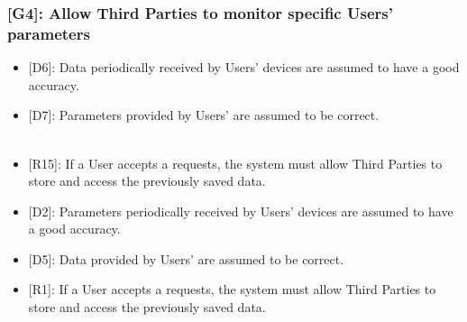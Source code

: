 \documentclass[12pt,a4paper]{article}
\begin{document}
	\subsubsection*{{[}{G4}{]}: Allow Third Parties to monitor specific Users' parameters}
	\begin{itemize}
		\begin{itemize}
			\item {[D6]}: Data periodically received by Users' devices are assumed to have a good accuracy. 
			\item {[D7]}: Parameters provided by Users' are assumed to be correct. 
			\\\\
			\item {[R15]}: If a User accepts a requests, the system must allow Third Parties to store and access the previously saved data.
			\item {[D2]}: Parameters periodically received by Users' devices are assumed to have a good accuracy. 
			\item {[D5]}: Data provided by Users' are assumed to be correct. 
			
			\item {[R1]}: If a User accepts a requests, the system must allow Third Parties to store and access the previously saved data.
		\end{itemize}
	\end{itemize}
\end{document}
